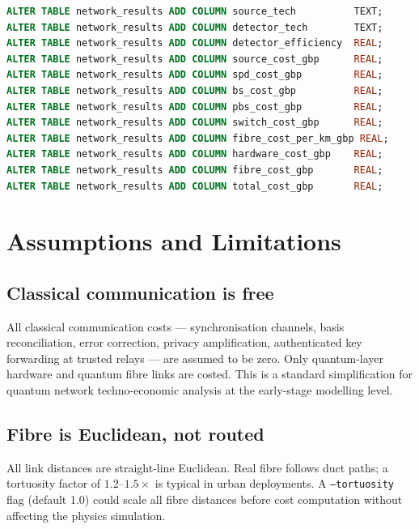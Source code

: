 \documentclass[12pt,a4paper]{article}
\begin{document}
\begin{lstlisting}[language=SQL]
ALTER TABLE network_results ADD COLUMN source_tech          TEXT;
ALTER TABLE network_results ADD COLUMN detector_tech        TEXT;
ALTER TABLE network_results ADD COLUMN detector_efficiency  REAL;
ALTER TABLE network_results ADD COLUMN source_cost_gbp      REAL;
ALTER TABLE network_results ADD COLUMN spd_cost_gbp         REAL;
ALTER TABLE network_results ADD COLUMN bs_cost_gbp          REAL;
ALTER TABLE network_results ADD COLUMN pbs_cost_gbp         REAL;
ALTER TABLE network_results ADD COLUMN switch_cost_gbp      REAL;
ALTER TABLE network_results ADD COLUMN fibre_cost_per_km_gbp REAL;
ALTER TABLE network_results ADD COLUMN hardware_cost_gbp    REAL;
ALTER TABLE network_results ADD COLUMN fibre_cost_gbp       REAL;
ALTER TABLE network_results ADD COLUMN total_cost_gbp       REAL;
\end{lstlisting}

\section{Assumptions and Limitations}

\label{sec:classical}
\subsection{Classical communication is free}

All classical communication costs --- synchronisation channels, basis
reconciliation, error correction, privacy amplification, authenticated key
forwarding at trusted relays --- are assumed to be zero. Only quantum-layer
hardware and quantum fibre links are costed. This is a standard simplification
for quantum network techno-economic analysis at the early-stage modelling level.

\subsection{Fibre is Euclidean, not routed}

All link distances are straight-line Euclidean. Real fibre follows duct
paths; a tortuosity factor of $1.2$--$1.5\times$ is typical in urban
deployments. A \texttt{--tortuosity} flag (default 1.0) could scale all
fibre distances before cost computation without affecting the physics simulation.
\end{document}
